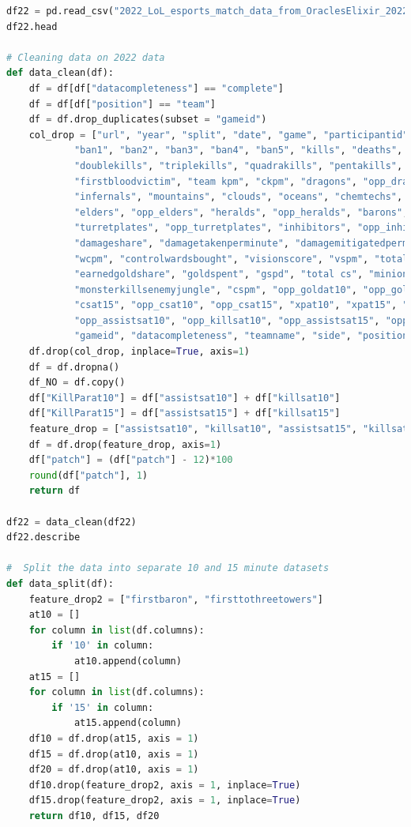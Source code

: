 \begin{lstlisting}[language=python,label={lst:pythoncode}]
df22 = pd.read_csv("2022_LoL_esports_match_data_from_OraclesElixir_20220606.csv")
df22.head

# Cleaning data on 2022 data
def data_clean(df):
    df = df[df["datacompleteness"] == "complete"]
    df = df[df["position"] == "team"]
    df = df.drop_duplicates(subset = "gameid")
    col_drop = ["url", "year", "split", "date", "game", "participantid", "playername", "playerid", "teamid", "champion",
            "ban1", "ban2", "ban3", "ban4", "ban5", "kills", "deaths", "assists", "teamkills", "teamdeaths",
            "doublekills", "triplekills", "quadrakills", "pentakills", "firstbloodkill", "firstbloodassist",
            "firstbloodvictim", "team kpm", "ckpm", "dragons", "opp_dragons", "elementaldrakes", "opp_elementaldrakes",
            "infernals", "mountains", "clouds", "oceans", "chemtechs", "hextechs", "dragons (type unknown)",
            "elders", "opp_elders", "heralds", "opp_heralds", "barons", "opp_barons", "towers", "opp_towers",
            "turretplates", "opp_turretplates", "inhibitors", "opp_inhibitors", "damagetochampions", "dpm",
            "damageshare", "damagetakenperminute", "damagemitigatedperminute", "wardsplaced", "wpm", "wardskilled",
            "wcpm", "controlwardsbought", "visionscore", "vspm", "totalgold", "earnedgold", "earned gpm",
            "earnedgoldshare", "goldspent", "gspd", "total cs", "minionkills", "monsterkills", "monsterkillsownjungle",
            "monsterkillsenemyjungle", "cspm", "opp_goldat10", "opp_goldat15", "goldat10", "goldat15", "csat10",
            "csat15", "opp_csat10", "opp_csat15", "xpat10", "xpat15", "opp_xpat10", "opp_xpat15", "league",
            "opp_assistsat10", "opp_killsat10", "opp_assistsat15", "opp_killsat15", "opp_deathsat10", "opp_deathsat15",
            "gameid", "datacompleteness", "teamname", "side", "position",]
    df.drop(col_drop, inplace=True, axis=1)
    df = df.dropna()
    df_NO = df.copy()
    df["KillParat10"] = df["assistsat10"] + df["killsat10"]
    df["KillParat15"] = df["assistsat15"] + df["killsat15"]
    feature_drop = ["assistsat10", "killsat10", "assistsat15", "killsat15", "golddiffat10", "golddiffat15", "xpdiffat10", "xpdiffat15"]
    df = df.drop(feature_drop, axis=1)
    df["patch"] = (df["patch"] - 12)*100
    round(df["patch"], 1)
    return df

df22 = data_clean(df22)
df22.describe

#  Split the data into separate 10 and 15 minute datasets
def data_split(df):
    feature_drop2 = ["firstbaron", "firsttothreetowers"]
    at10 = []
    for column in list(df.columns):
        if '10' in column:
            at10.append(column)
    at15 = []
    for column in list(df.columns):
        if '15' in column:
            at15.append(column)
    df10 = df.drop(at15, axis = 1)
    df15 = df.drop(at10, axis = 1)
    df20 = df.drop(at10, axis = 1)
    df10.drop(feature_drop2, axis = 1, inplace=True)
    df15.drop(feature_drop2, axis = 1, inplace=True)
    return df10, df15, df20


\end{lstlisting}
